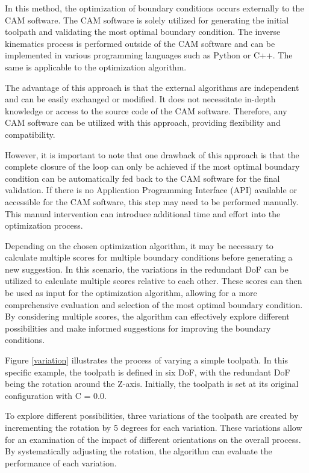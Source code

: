 In this method, the optimization of boundary conditions occurs externally to the \acrshort{CAM} software. The \acrshort{CAM} software is solely utilized for generating the initial toolpath and validating the most optimal boundary condition. The inverse kinematics process is performed outside of the \acrshort{CAM} software and can be implemented in various programming languages such as Python or C++. The same is applicable to the optimization algorithm.

The advantage of this approach is that the external algorithms are independent and can be easily exchanged or modified. It does not necessitate in-depth knowledge or access to the source code of the \acrshort{CAM} software. Therefore, any \acrshort{CAM} software can be utilized with this approach, providing flexibility and compatibility.    

However, it is important to note that one drawback of this approach is that the complete closure of the loop can only be achieved if the most optimal boundary condition can be automatically fed back to the \acrshort{CAM} software for the final validation. If there is no Application Programming Interface (\acrshort{API}) available or accessible for the \acrshort{CAM} software, this step may need to be performed manually. This manual intervention can introduce additional time and effort into the optimization process.

Depending on the chosen optimization algorithm, it may be necessary to calculate multiple scores for multiple boundary conditions before generating a new suggestion. In this scenario, the variations in the redundant \acrshort{DoF} can be utilized to calculate multiple scores relative to each other. These scores can then be used as input for the optimization algorithm, allowing for a more comprehensive evaluation and selection of the most optimal boundary condition. By considering multiple scores, the algorithm can effectively explore different possibilities and make informed suggestions for improving the boundary conditions.

Figure \ref{variation} illustrates the process of varying a simple toolpath. In this specific example, the toolpath is defined in six \acrshort{DoF}, with the redundant \acrshort{DoF} being the rotation around the Z-axis. Initially, the toolpath is set at its original configuration with C = 0.0.

To explore different possibilities, three variations of the toolpath are created by incrementing the rotation by 5 degrees for each variation. These variations allow for an examination of the impact of different orientations on the overall process. By systematically adjusting the rotation, the algorithm can evaluate the performance of each variation.


